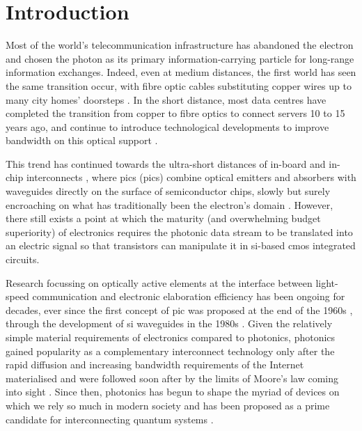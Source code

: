 \chapter{Introduction}
\label{chap:introduction}

Most of the world's telecommunication infrastructure has abandoned the electron and chosen the photon as its primary information-carrying particle for long-range information exchanges. Indeed, even at medium distances, the first world has seen the same transition occur, with fibre optic cables substituting copper wires up to many city homes' doorsteps \cite{ECBroadband, ETNOBroadband}. In the short distance, most data centres have completed the transition from copper to fibre optics to connect servers \num{10} to \num{15} years ago, and continue to introduce technological developments to improve bandwidth on this optical support \cite{Cheng2018}. 

This trend has continued towards the ultra-short distances of in-board and in-chip interconnects \cite{Benner2005}, where \acl{pic}s (\acs{pic}s) combine optical emitters and absorbers with waveguides directly on the surface of semiconductor chips, slowly but surely encroaching on what has traditionally been the electron's domain \cite{Shekhar2024, Margalit2021, Smit2019}. However, there still exists a point at which the maturity (and overwhelming budget superiority) of electronics requires the photonic data stream to be translated into an electric signal so that transistors can manipulate it in \acl{si}-based \acf{cmos} integrated circuits. 

Research focussing on optically active elements at the interface between light-speed communication and electronic elaboration efficiency has been ongoing for decades, ever since the first concept of \acs{pic} was proposed at the end of the 1960s \cite{Miller1969}, through the development of \acl{si} waveguides in the 1980s \cite{Soref1987, Pathak2019}. Given the relatively simple material requirements of electronics compared to photonics, photonics gained popularity as a complementary interconnect technology only after the rapid diffusion and increasing bandwidth requirements of the Internet materialised and were followed soon after by the limits of Moore's law coming into sight \cite{Bohr1995, Markov2014}. Since then, photonics has begun to shape the myriad of devices on which we rely so much in modern society and has been proposed as a prime candidate for interconnecting quantum systems \cite{Luo2023}.

